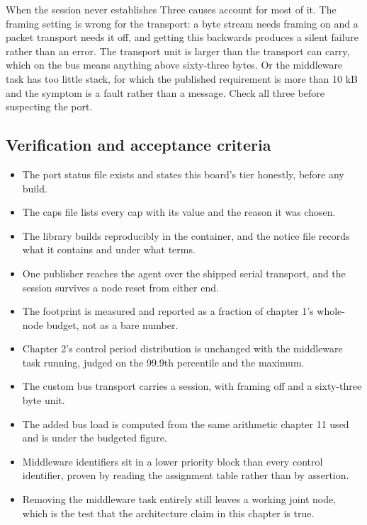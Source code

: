 \begin{note}{When the session never establishes}
Three causes account for most of it. The framing setting is wrong for the
transport: a byte stream needs framing on and a packet transport needs it off,
and getting this backwards produces a silent failure rather than an error. The
transport unit is larger than the transport can carry, which on the bus means
anything above sixty-three bytes. Or the middleware task has too little stack,
for which the published requirement is more than 10 kB and the symptom is a
fault rather than a message. Check all three before suspecting the port.
\end{note}

\subsection*{Verification and acceptance criteria}

\begin{itemize}
\item The port status file exists and states this board's tier honestly, before
any build.
\item The caps file lists every cap with its value and the reason it was chosen.
\item The library builds reproducibly in the container, and the notice file
records what it contains and under what terms.
\item One publisher reaches the agent over the shipped serial transport, and the
session survives a node reset from either end.
\item The footprint is measured and reported as a fraction of chapter 1's
whole-node budget, not as a bare number.
\item Chapter 2's control period distribution is unchanged with the middleware
task running, judged on the 99.9th percentile and the maximum.
\item The custom bus transport carries a session, with framing off and a
sixty-three byte unit.
\item The added bus load is computed from the same arithmetic chapter 11 used
and is under the budgeted figure.
\item Middleware identifiers sit in a lower priority block than every control
identifier, proven by reading the assignment table rather than by assertion.
\item Removing the middleware task entirely still leaves a working joint node,
which is the test that the architecture claim in this chapter is true.
\end{itemize}

